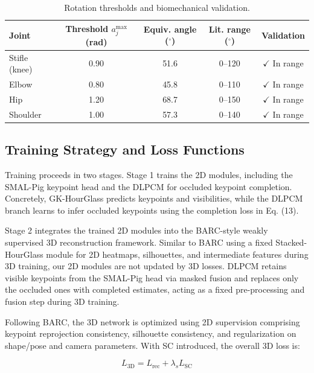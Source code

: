 \documentclass[computers,article,submit,pdftex,moreauthors]{Definitions/mdpi}
\begin{document}
\begin{table}[H]
\caption{Rotation thresholds and biomechanical validation.}
\label{tab:biomech_thresholds}
\centering
\small
\begin{tabular}{lcccc}
\toprule
\textbf{Joint} & \textbf{Threshold $a_j^{\max}$ (rad)} & \textbf{Equiv. angle ($^\circ$)} & \textbf{Lit. range ($^\circ$)} & \textbf{Validation} \\
\midrule
Stifle (knee) & 0.90 & 51.6 & 0--120 & $\checkmark$ In range \\
Elbow & 0.80 & 45.8 & 0--110 & $\checkmark$ In range \\
Hip & 1.20 & 68.7 & 0--150 & $\checkmark$ In range \\
Shoulder & 1.00 & 57.3 & 0--140 & $\checkmark$ In range \\
\bottomrule
\end{tabular}
\end{table}

\subsection{Training Strategy and Loss Functions}\label{sec:training}

Training proceeds in two stages. Stage 1 trains the 2D modules, including the SMAL-Pig keypoint head and the DLPCM for occluded keypoint completion. Concretely, GK-HourGlass predicts keypoints and visibilities, while the DLPCM branch learns to infer occluded keypoints using the completion loss in Eq. (13).

Stage 2 integrates the trained 2D modules into the BARC-style weakly supervised 3D reconstruction framework. Similar to BARC using a fixed Stacked-HourGlass module for 2D heatmaps, silhouettes, and intermediate features during 3D training, our 2D modules are not updated by 3D losses. DLPCM retains visible keypoints from the SMAL-Pig head via masked fusion and replaces only the occluded ones with completed estimates, acting as a fixed pre-processing and fusion step during 3D training.

Following BARC, the 3D network is optimized using 2D supervision comprising keypoint reprojection consistency, silhouette consistency, and regularization on shape/pose and camera parameters. With SC introduced, the overall 3D loss is:

\begin{equation}
L_{\text{3D}} = L_{\text{rec}} + \lambda_s L_{\text{SC}}
\end{equation}
\end{document}
